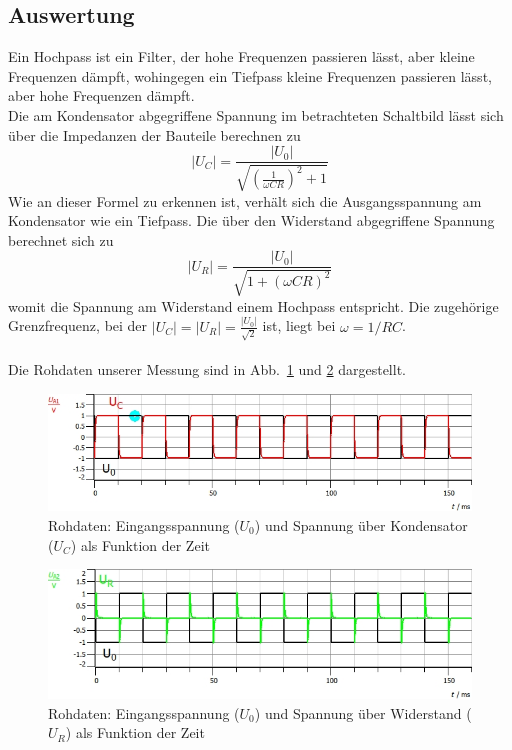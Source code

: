 \documentclass[12pt,a4paper]{article}
\begin{document}
\subsection{Auswertung}
Ein Hochpass ist ein Filter, der hohe Frequenzen passieren lässt, aber kleine Frequenzen dämpft, wohingegen ein Tiefpass kleine Frequenzen passieren lässt, aber hohe Frequenzen dämpft.\\
Die am Kondensator abgegriffene Spannung im betrachteten Schaltbild lässt sich über die Impedanzen der Bauteile berechnen zu
\begin{equation}
|U_C|=\frac{|U_0|}{\sqrt{(\frac{1}{\omega CR})^2+1}}
\end{equation}\label{eq:Tiefpass}
Wie an dieser Formel zu erkennen ist, verhält sich die Ausgangsspannung am Kondensator wie ein Tiefpass.
Die über den Widerstand abgegriffene Spannung berechnet sich zu
\begin{equation}
|U_R|=\frac{|U_0|}{\sqrt{1+(\omega CR)^2}}
\end{equation}\label{eq:Hochpass}
womit die Spannung am Widerstand einem Hochpass entspricht. Die zugehörige Grenzfrequenz, bei der $|U_C|=|U_R|=\frac{|U_0|}{\sqrt{2}}$ ist, liegt bei $\omega=1/RC$.\\
\\
Die Rohdaten unserer Messung sind in Abb.~\ref{HT_Rohdaten_C} und \ref{HT_Rohdaten_R} dargestellt.
\begin{figure}[H]
	\centering
	\includegraphics[width=1\textwidth]{Daten/50Hz_Rohdaten_UC.jpg}
	\caption{Rohdaten: Eingangsspannung ($U_0$) und Spannung über Kondensator ($U_C$) als Funktion der Zeit}
	\label{HT_Rohdaten_C}
\end{figure}
\begin{figure}[H]
	\centering
	\includegraphics[width=1\textwidth]{Daten/50Hz_Rohdaten_UR.jpg}
	\caption{Rohdaten: Eingangsspannung ($U_0$) und Spannung über Widerstand ($U_R$) als Funktion der Zeit}
	\label{HT_Rohdaten_R}
\end{figure}
\end{document}
